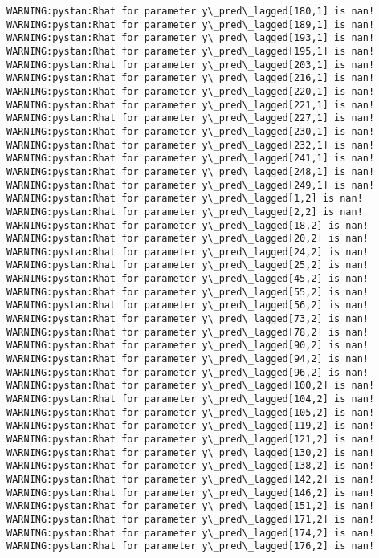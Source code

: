 \documentclass[11pt]{article}
\begin{document}
\begin{Verbatim}[commandchars=\\\{\}]
WARNING:pystan:Rhat for parameter y\_pred\_lagged[180,1] is nan!
WARNING:pystan:Rhat for parameter y\_pred\_lagged[189,1] is nan!
WARNING:pystan:Rhat for parameter y\_pred\_lagged[193,1] is nan!
WARNING:pystan:Rhat for parameter y\_pred\_lagged[195,1] is nan!
WARNING:pystan:Rhat for parameter y\_pred\_lagged[203,1] is nan!
WARNING:pystan:Rhat for parameter y\_pred\_lagged[216,1] is nan!
WARNING:pystan:Rhat for parameter y\_pred\_lagged[220,1] is nan!
WARNING:pystan:Rhat for parameter y\_pred\_lagged[221,1] is nan!
WARNING:pystan:Rhat for parameter y\_pred\_lagged[227,1] is nan!
WARNING:pystan:Rhat for parameter y\_pred\_lagged[230,1] is nan!
WARNING:pystan:Rhat for parameter y\_pred\_lagged[232,1] is nan!
WARNING:pystan:Rhat for parameter y\_pred\_lagged[241,1] is nan!
WARNING:pystan:Rhat for parameter y\_pred\_lagged[248,1] is nan!
WARNING:pystan:Rhat for parameter y\_pred\_lagged[249,1] is nan!
WARNING:pystan:Rhat for parameter y\_pred\_lagged[1,2] is nan!
WARNING:pystan:Rhat for parameter y\_pred\_lagged[2,2] is nan!
WARNING:pystan:Rhat for parameter y\_pred\_lagged[18,2] is nan!
WARNING:pystan:Rhat for parameter y\_pred\_lagged[20,2] is nan!
WARNING:pystan:Rhat for parameter y\_pred\_lagged[24,2] is nan!
WARNING:pystan:Rhat for parameter y\_pred\_lagged[25,2] is nan!
WARNING:pystan:Rhat for parameter y\_pred\_lagged[45,2] is nan!
WARNING:pystan:Rhat for parameter y\_pred\_lagged[55,2] is nan!
WARNING:pystan:Rhat for parameter y\_pred\_lagged[56,2] is nan!
WARNING:pystan:Rhat for parameter y\_pred\_lagged[73,2] is nan!
WARNING:pystan:Rhat for parameter y\_pred\_lagged[78,2] is nan!
WARNING:pystan:Rhat for parameter y\_pred\_lagged[90,2] is nan!
WARNING:pystan:Rhat for parameter y\_pred\_lagged[94,2] is nan!
WARNING:pystan:Rhat for parameter y\_pred\_lagged[96,2] is nan!
WARNING:pystan:Rhat for parameter y\_pred\_lagged[100,2] is nan!
WARNING:pystan:Rhat for parameter y\_pred\_lagged[104,2] is nan!
WARNING:pystan:Rhat for parameter y\_pred\_lagged[105,2] is nan!
WARNING:pystan:Rhat for parameter y\_pred\_lagged[119,2] is nan!
WARNING:pystan:Rhat for parameter y\_pred\_lagged[121,2] is nan!
WARNING:pystan:Rhat for parameter y\_pred\_lagged[130,2] is nan!
WARNING:pystan:Rhat for parameter y\_pred\_lagged[138,2] is nan!
WARNING:pystan:Rhat for parameter y\_pred\_lagged[142,2] is nan!
WARNING:pystan:Rhat for parameter y\_pred\_lagged[146,2] is nan!
WARNING:pystan:Rhat for parameter y\_pred\_lagged[151,2] is nan!
WARNING:pystan:Rhat for parameter y\_pred\_lagged[171,2] is nan!
WARNING:pystan:Rhat for parameter y\_pred\_lagged[174,2] is nan!
WARNING:pystan:Rhat for parameter y\_pred\_lagged[176,2] is nan!

\end{Verbatim}
\end{document}

